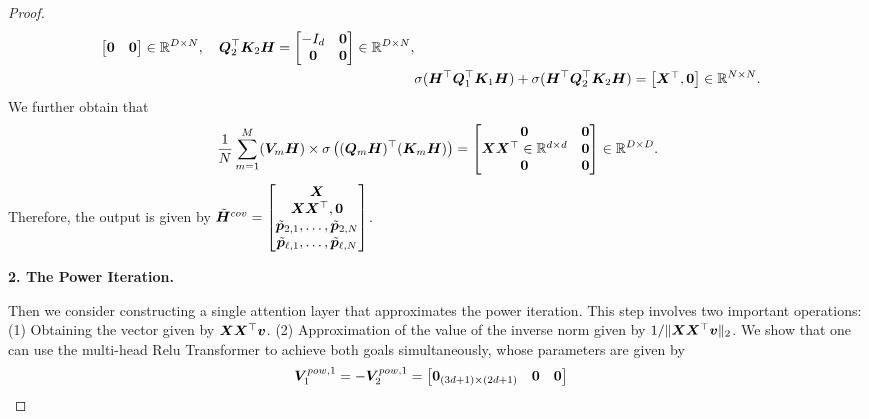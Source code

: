 \begin{proof}
\begin{align*}
\begin{bmatrix}
            \boldsymbol{0}&\boldsymbol{0}
        \end{bmatrix}\in\mathbb{R}^{D\times N},\quad\boldsymbol{Q}_2^\top\boldsymbol{K}_2\boldsymbol{H}=\begin{bmatrix}
            -I_{d}&\boldsymbol{0}\\
            \boldsymbol{0}&\boldsymbol{0}
        \end{bmatrix}\in\mathbb{R}^{D\times N},\\
        &\sigma(\boldsymbol{H}^\top\boldsymbol{Q}_1^\top\boldsymbol{K}_1\boldsymbol{H})+\sigma(\boldsymbol{H}^\top\boldsymbol{Q}_2^\top\boldsymbol{K}_2\boldsymbol{H})=\begin{bmatrix}
            \boldsymbol{X}^\top,\boldsymbol{0}
        \end{bmatrix}\in\mathbb{R}^{N\times N}.
    \end{align*}
   We further obtain that
    \begin{align*}
        \frac{1}{N}\sum_{m=1}^M(\boldsymbol{V}_m\boldsymbol{H})\times \sigma\left((\boldsymbol{Q}_m\boldsymbol{H})^\top(\boldsymbol{K}_m\boldsymbol{H})\right)=\begin{bmatrix}
        \boldsymbol{0}&\boldsymbol{0}\\
            \boldsymbol{X}\boldsymbol{X}^\top\in\mathbb{R}^{d\times d}&\boldsymbol{0}\\
            \boldsymbol{0}&\boldsymbol{0}
        \end{bmatrix}\in\mathbb{R}^{D\times D}.
    \end{align*}
    Therefore, the output is given by  $\tilde{\boldsymbol{H}}^{cov}=\begin{bmatrix}
            \boldsymbol{X}\\
            \boldsymbol{X}\boldsymbol{X}^\top,\boldsymbol{0}\\
            \tilde{\boldsymbol{p}}_{2,1},\ldots,\tilde{\boldsymbol{p}}_{2,N}\\
            \tilde{\boldsymbol{p}}_{\ell,1},\ldots,\tilde{\boldsymbol{p}}_{\ell,N}
        \end{bmatrix}$. 
    \begin{center}
        \textbf{2. The Power Iteration.}
    \end{center}
    Then we consider constructing a single attention layer that approximates the power iteration. This step involves two important operations: (1) Obtaining the vector given by $\boldsymbol{X}\boldsymbol{X}^\top\boldsymbol{v}$. (2) Approximation of the value of the inverse norm given by $1/\Vert \boldsymbol{X}\boldsymbol{X}^\top\boldsymbol{v}\Vert_2$. We show that one can use the multi-head Relu Transformer to achieve both goals simultaneously, whose parameters are given by 
    \begin{align*}
        \boldsymbol{V}_{1}^{pow,1}&=-\boldsymbol{V}_{2}^{pow,1}=\begin{bmatrix}
            \boldsymbol{0}_{(3d+1)\times (2d+1)}&\boldsymbol{0}&\boldsymbol{0}\\

\end{bmatrix}
\end{align*}
\end{proof}
